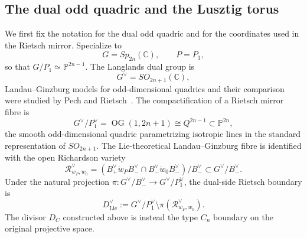 \documentclass{article}
\newcommand{\CC}{\mathbb{C}}
\newcommand{\PP}{\mathbb{P}}
\begin{document}
\subsection{The dual odd quadric and the Lusztig torus}
We first fix the notation for the dual odd quadric and for the coordinates used in the Rietsch mirror. Specialize to
\[
G=Sp_{2n}(\CC),
\qquad
P=P_1,
\]
so that \(G/P_1\simeq \PP^{2n-1}\). The Langlands dual group is
\[
G^\vee=SO_{2n+1}(\CC),
\]
Landau--Ginzburg models for odd-dimensional quadrics and their comparison were studied by Pech and Rietsch~\cite{PR}.
The compactification of a Rietsch mirror fibre is
\[
G^\vee/P_1^\vee
=
\operatorname{OG}(1,2n+1)
\cong Q^{2n-1}\subset \PP^{2n},
\]
the smooth odd-dimensional quadric parametrizing isotropic lines in the standard representation of \(SO_{2n+1}\).
The Lie-theoretical Landau--Ginzburg fibre is identified with the open Richardson variety
\[
\mathcal R_{w_P,w_0}^\vee
=
(B_+^\vee\dot w_PB_-^\vee \cap B_-^\vee\dot w_0B_-^\vee)/B_-^\vee
\subset G^\vee/B_-^\vee .
\]
Under the natural projection \(\pi\colon G^\vee/B_-^\vee\to G^\vee/P_1^\vee\), the dual-side Rietsch boundary is
\[
D_{\mathrm{Lie}}^\vee
:=
G^\vee/P_1^\vee\setminus \pi(\mathcal R_{w_P,w_0}^\vee).
\]
The divisor \(D_C\) constructed above is instead the type \(C_n\) boundary on the original projective space.
\end{document}
